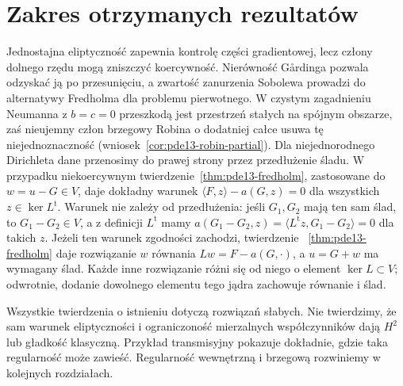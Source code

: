 \section{Zakres otrzymanych rezultatów}
\label{sec:pde13-summary}
Jednostajna eliptyczność zapewnia kontrolę części gradientowej,
lecz człony dolnego rzędu mogą zniszczyć koercywność.
Nierówność Gårdinga pozwala odzyskać ją po przesunięciu,
a zwartość zanurzenia Sobolewa prowadzi do alternatywy Fredholma
dla problemu pierwotnego. W czystym zagadnieniu Neumanna z $b=c=0$ przeszkodą
jest przestrzeń stałych na spójnym obszarze, zaś nieujemny
człon brzegowy Robina o dodatniej całce usuwa tę niejednoznaczność
(wniosek~\ref{cor:pde13-robin-partial}).
Dla niejednorodnego Dirichleta dane przenosimy do prawej
strony przez przedłużenie śladu. W przypadku niekoercywnym
twierdzenie~\ref{thm:pde13-fredholm}, zastosowane do
$w=u-G\in V$, daje dokładny warunek
$\langle F,z\rangle-a(G,z)=0$ dla wszystkich
$z\in\ker L^{\mathrm t}$.
Warunek nie zależy od przedłużenia: jeśli $G_1,G_2$
mają ten sam ślad, to $G_1-G_2\in V$, a z definicji
$L^{\mathrm t}$ mamy $a(G_1-G_2,z)
=\langle L^{\mathrm t}z,G_1-G_2\rangle=0$ dla takich $z$.
Jeżeli ten warunek zgodności zachodzi, twierdzenie
~\ref{thm:pde13-fredholm} daje rozwiązanie $w$ równania
$Lw=F-a(G,\cdot)$, a $u=G+w$ ma wymagany ślad.
Każde inne rozwiązanie różni się od niego o element
$\ker L\subset V$; odwrotnie, dodanie dowolnego elementu
tego jądra zachowuje równanie i ślad.

Wszystkie twierdzenia o istnieniu dotyczą rozwiązań słabych.
Nie twierdzimy, że sam warunek eliptyczności i ograniczoność
mierzalnych współczynników dają $H^2$ lub gładkość klasyczną.
Przykład transmisyjny pokazuje dokładnie, gdzie taka
regularność może zawieść. Regularność wewnętrzną i brzegową
rozwiniemy w kolejnych rozdziałach.


